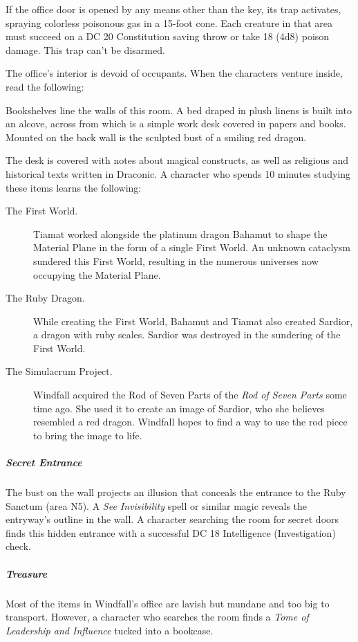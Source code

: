 \documentclass[10pt,a4paper,twoside,bg=print,twocolumn,openany,nodeprecatedcode]{dndbook}
\begin{document}
If the office door is opened by any means other than the key, its trap activates, spraying colorless poisonous gas in a 15-foot cone. Each creature in that area must succeed on a DC 20 Constitution saving throw or take 18 (4d8) poison damage. This trap can't be disarmed.

The office's interior is devoid of occupants. When the characters venture inside, read the following:

\begin{DndReadAloud}{}
Bookshelves line the walls of this room. A bed draped in plush linens is built into an alcove, across from which is a simple work desk covered in papers and books. Mounted on the back wall is the sculpted bust of a smiling red dragon.

\end{DndReadAloud}

The desk is covered with notes about magical constructs, as well as religious and historical texts written in Draconic. A character who spends 10 minutes studying these items learns the following:


\begin{description}
\item[The First World.]
Tiamat worked alongside the platinum dragon Bahamut to shape the Material Plane in the form of a single First World. An unknown cataclysm sundered this First World, resulting in the numerous universes now occupying the Material Plane.
\item[The Ruby Dragon.]
While creating the First World, Bahamut and Tiamat also created Sardior, a dragon with ruby scales. Sardior was destroyed in the sundering of the First World.
\item[The Simulacrum Project.]
Windfall acquired the Rod of Seven Parts of the \textit{Rod of Seven Parts} some time ago. She used it to create an image of Sardior, who she believes resembled a red dragon. Windfall hopes to find a way to use the rod piece to bring the image to life.
\end{description}

\subparagraph{Secret Entrance}
The bust on the wall projects an illusion that conceals the entrance to the Ruby Sanctum (area N5). A \textit{See Invisibility} spell or similar magic reveals the entryway's outline in the wall. A character searching the room for secret doors finds this hidden entrance with a successful DC 18 Intelligence (Investigation) check.

\subparagraph{Treasure}
Most of the items in Windfall's office are lavish but mundane and too big to transport. However, a character who searches the room finds a \textit{Tome of Leadership and Influence} tucked into a bookcase.
\end{document}
